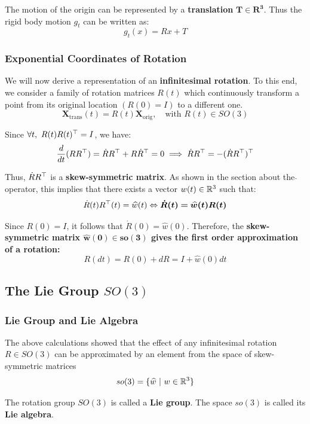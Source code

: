 The motion of the origin can be represented by a \textbf{translation}
$\bm{T \in R^3}$. Thus the rigid body motion $g_t$ can be written as:
	\[g_t(x) = Rx + T\]


\subsubsection{Exponential Coordinates of Rotation}%
\label{ssub:exponential_coordinates_of_rotation}

We will now derive a representation of an \textbf{infinitesimal rotation}.
To this end, we consider a family of rotation matrices $R(t)$
which continuously transform a point from its original location
$(R(0) = I)$ to a different one.
	\[\bm{X}_{\text{trans}}(t) = R(t)\bm{X}_{\text{orig}}, \quad
	\text{with } R(t) \in SO(3)\]

Since $\forall t,\ R(t)R(t)^{\top} = I$, we have:
	\[\frac{d}{dt}(RR^{\top}) = \dot{R}R^{\top} + R\dot{R}^{\top}= 0
	\implies \dot{R}R^{\top} = -( \dot{R}R^{\top} )^{\top}\]

Thus, $\dot{R}R^{\top}$ is a \textbf{skew-symmetric matrix}.
As shown in the section about the $\widehat{}$ operator, this implies that
there exists a vector $w(t) \in \mathbb{R}^3$ such that:
	\[\dot{R}(t)R^{\top}(t) = \widehat{w}(t)
	\Leftrightarrow \bm{ \dot{R}(t) = \widehat{w}(t)R(t)}\]

Since $R(0) = I$, it follows that $\dot{R}(0) = \widehat{w}(0)$.
Therefore, the \textbf{skew-symmetric matrix $\bm{\widehat{w}(0) \in so(3)}$
gives the first order approximation of a rotation:}
	\[R(dt) = R(0) + dR = I + \widehat{w}(0) dt\]


\subsection{The Lie Group $SO(3)$}%
\label{sub:the_lie_group_so_3_}


\subsubsection{Lie Group and Lie Algebra}%
\label{ssub:lie_group_and_lie_algebra}

The above calculations showed that the effect of any infinitesimal
rotation $R \in SO(3)$ can be approximated by an element from
the space of skew-symmetric matrices
	\[so(3) = \{ \widehat{w}\ |\ w \in \mathbb{R}^3\}\]

The rotation group $SO(3)$ is called a \textbf{Lie group}.
The space $so(3)$ is called its \textbf{Lie algebra}.\\

